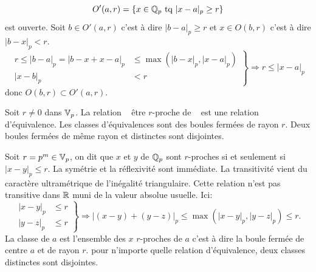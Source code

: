 \begin{demo}
\begin{displaymath}
 O'(a,r) = \left\lbrace x\in \mathbb{Q}_p \text{ tq } |x-a|_p \geq r \right\rbrace
\end{displaymath}
est ouverte. Soit $b\in O'(a,r)$ c'est à dire $|b-a|_p \geq r$ et $x\in O(b,r)$ c'est à dire $|b-x|_p < r$.
\begin{displaymath}
\left.
  \begin{aligned}
    r \leq |b-a|_p = |b-x + x-a|_p &\leq \max(|b-x|_p, |x-a|_p) \\
    |x-b|_p &< r
  \end{aligned}
\right\rbrace
    \Rightarrow
    r \leq |x-a|_p
\end{displaymath}
donc $O(b,r) \subset O'(a,r)$.
\end{demo}

\begin{propn}\label{prop:r-procheEquiv}
Soit $r \neq 0$ dans $\mathbb{V}_p$. La relation \og~ être $r$-proche de ~\fg{}  est une relation d'équivalence. Les classes d'équivalences sont des boules fermées de rayon $r$. Deux boules fermées de même rayon et distinctes sont disjointes.
\end{propn}
\begin{demo}
 Soit $r = p^m  \in \mathbb{V}_p$, on dit que $x$ et $y$ de $\mathbb{Q}_p$ sont $r$-proches si et seulement si $|x-y|_p \leq r$.\newline
 La symétrie et la réflexivité sont immédiate. La transitivité vient du caractère ultramétrique de l'inégalité triangulaire. Cette relation n'est pas transitive dans $\mathbb{R}$ muni de la valeur absolue usuelle. Ici:
 \begin{displaymath}
  \left.
  \begin{aligned}
   |x-y|_p &\leq r \\
   |y-z|_p &\leq r
  \end{aligned}
  \right\rbrace \Rightarrow
  |(x-y) + (y-z)|_p \leq \max\left(|x-y|_p, |y-z|_p  \right) \leq r.
 \end{displaymath}
 La classe de $a$ est l'ensemble des $x$ $r$-proches de $a$ c'est à dire la boule fermée de centre $a$ et de rayon $r$. pour n'importe quelle relation d'équivalence, deux classes distinctes sont disjointes.
\end{demo}

